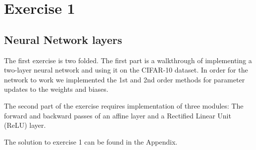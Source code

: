 \graphicspath{{Chapters/Exercise1/}}

\chapter{Exercise 1}

\section{Neural Network layers} %
\label{sec:Neural_Networ_layers}


The first exercise is two folded. The first part is a walkthrough of
implementing a two-layer neural network and using it on the CIFAR-10 dataset. In
order for the network to work we implemented the 1st and 2nd order methods for
parameter updates to the weights and biases. 

The second part of the exercise requires implementation of three modules: The
forward and backward passes of an affine layer and a Rectified Linear Unit
(ReLU) layer.  

The solution to exercise 1 can be found in the Appendix. 

